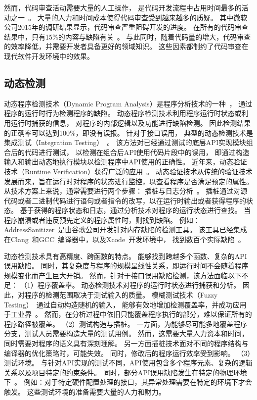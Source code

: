 然而，代码审查活动需要大量的人工操作，
是代码开发流程中占用时间最多的活动之一~\cite{13-esem-code-review}。
大量的人力和时间成本使得代码审查受到越来越多的质疑。
其中微软公司2015年的调研结果显示，代码审查严重阻碍开发的进度。
在所有的代码审查结果中，只有15\%的内容与缺陷有关~\cite{15-icse-code-review}。
与此同时，随着代码量的增大，代码审查的效率降低，并需要开发者具备更好的领域知识。
这些因素都制约了代码审查在现代软件开发环境中的效果。


\subsection{动态检测}
动态程序检测技术（Dynamic Program Analysis）是程序分析技术的一种~\cite{15-pa}，
通过程序的运行时行为检测程序的缺陷。
动态程序检测技术利用程序运行时状态或利用运行时捕获的信息，
对程序的内部逻辑以及功能进行缺陷检测。
因此检测结果的正确率可以达到100\%，即没有误报。
针对于接口误用，
典型的动态检测技术是集成测试（Integration Testing）~\cite{17-trustcom-test}。
该方法对已经通过测试的底层API实现模块组合后的代码进行测试，
以检测在组合后API使用代码片段中的误用，
即通过构造输入和输出动态地执行模块以检测程序中API使用的正确性。
近年来，动态验证技术（Runtime Verification）获得广泛的应用~\cite{18-rv}。
动态验证技术从传统的验证技术发展而来，旨在运行时对程序的状态进行监控，以查看程序是否满足预定的属性。
从技术方案上来说，通常需要进行两个步骤：
插桩与日志分析~\cite{07-acm-valgrind, 12-atc-AddressSanitizer}。
插桩通过对源代码或者二进制代码进行语句或者指令的改写，以在运行时输出或者获得程序的状态。
基于获得的程序状态和日志，通过分析技术对程序的运行状态进行查找。
当程序崩溃或者违反预先定义的程序属性时，则找到缺陷。
例如：AddressSanitizer~\cite{12-atc-AddressSanitizer}是由谷歌公司开发针对内存缺陷的检测工具。
该工具已经集成在Clang~\cite{clang}和GCC~\cite{gcc}编译器中，以及Xcode~\cite{Xcode}开发环境中，
找到数百个实际缺陷~\cite{AddressSanitizerFoundBugs}。


动态检测技术具有高精度、跨函数的特点。
能够找到跨越多个函数、复杂的API误用缺陷。
同时，其复杂度与程序的规模呈线性关系，即运行时间不会随着程序规模变化而产生巨大开销。
然而，针对于接口误用缺陷检测，该方法面临以下不足：
（1）程序覆盖率。
动态检测技术对程序的运行时状态进行捕获和分析。
因此，对程序的检测范围取决于测试输入的质量。
模糊测试技术（Fuzzy Testing）~\cite{18-fuzz}通过自动构造随机的输入，
能够有效地增加检测覆盖率，并成功应用于工业界~\cite{18-saner-fuzz}。
然而，在分析过程中依旧只能覆盖程序执行的部分，难以保证所有的程序路径被覆盖。
（2）测试构造与插桩。
一方面，为能够尽可能多地覆盖程序分支，测试人员需要构造大量的测试用例。
然而，这需要大量人力资本和时间，同时需要对程序的语义具有深刻理解。
另一方面插桩技术面对不同的程序结构与编译器的优化策略时，可能失效。
同时，修改后的程序运行效率受到影响。
（3）测试环境。
与针对API实现的测试不同，API使用包含多个程序元素、复杂的逻辑关系以及项目特定的约束条件。
同时，部分API误用缺陷发生在特定的物理环境下~\cite{15-kernel-sv}。
例如：对于特定硬件配置处理的接口，其异常处理需要在特定的环境下才会触发。
这些测试环境的准备需要大量的人力和财力。

